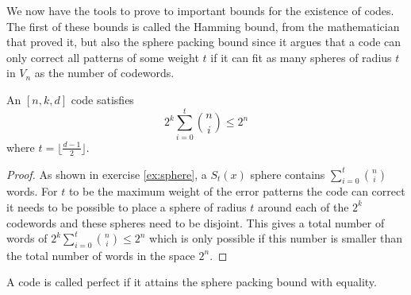 We now have the tools to prove to important bounds for the existence of codes. The first of these bounds is called the Hamming bound, from the mathematician that proved it, but also the sphere packing bound since it argues that a code can only correct all patterns of some weight $t$ if it can fit as many spheres of radius $t$ in $V_n$ as the number of codewords.
\begin{theorem}
An $[n,k,d]$ code satisfies 
\begin{equation}
2^k\sum_{i=0}^t{n\choose i}\leq 2^n
\end{equation}
where $t=\lfloor\frac{d-1}{2}\rfloor$.
\end{theorem}
\begin{proof}
As shown in exercise \ref{ex:sphere}, a $S_t(x)$ sphere contains $\sum_{i=0}^t{n\choose i}$ words. For $t$ to be the maximum weight of the error patterns the code can correct it needs to be possible to place a sphere of radius $t$ around each of the $2^k$ codewords and these spheres need to be disjoint. This gives a total number of words of $2^k\sum_{i=0}^t{n\choose i}\leq 2^n$ which is only possible if this number is smaller than the total number of words in the space $2^n$.
\end{proof}
A code is called perfect if it attains the sphere packing bound with equality.


